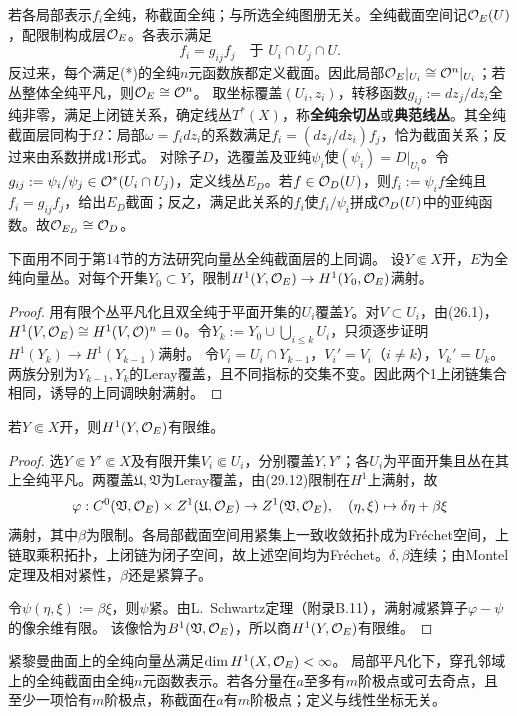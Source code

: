 若各局部表示$f_i$全纯，称截面全纯；与所选全纯图册无关。全纯截面空间记$\mathcal O_E(U)$，配限制构成层$\mathcal O_E$。各表示满足
\begin{equation}f_i=g_{ij}f_j\quad\text{于 }U_i\cap U_j\cap U.\tag{*}\end{equation}
反过来，每个满足(*)的全纯$n$元函数族都定义截面。因此局部$\mathcal O_E|_{U_i}\cong\mathcal O^n|_{U_i}$；若丛整体全纯平凡，则$\mathcal O_E\cong\mathcal O^n$。
取坐标覆盖$(U_i,z_i)$，转移函数$g_{ij}:=dz_j/dz_i$全纯非零，满足上闭链关系，确定线丛$T^*(X)$，称\textbf{全纯余切丛}或\textbf{典范线丛}。其全纯截面层同构于$\Omega$：局部$\omega=f_i dz_i$的系数满足$f_i=(dz_j/dz_i)f_j$，恰为截面关系；反过来由系数拼成1形式。
对除子$D$，选覆盖及亚纯$\psi_i$使$(\psi_i)=D|_{U_i}$。令$g_{ij}:=\psi_i/\psi_j\in\mathcal O^*(U_i\cap U_j)$，定义线丛$E_D$。若$f\in\mathcal O_D(U)$，则$f_i:=\psi_if$全纯且$f_i=g_{ij}f_j$，给出$E_D$截面；反之，满足此关系的$f_i$使$f_i/\psi_i$拼成$\mathcal O_D(U)$中的亚纯函数。故$\mathcal O_{E_D}\cong\mathcal O_D$。

下面用不同于第14节的方法研究向量丛全纯截面层的上同调。
设$Y\Subset X$开，$E$为全纯向量丛。对每个开集$Y_0\subset Y$，限制$H^1(Y,\mathcal O_E)\to H^1(Y_0,\mathcal O_E)$满射。
\begin{proof}
用有限个丛平凡化且双全纯于平面开集的$U_i$覆盖$Y$。对$V\subset U_i$，由(26.1)，$H^1(V,\mathcal O_E)\cong H^1(V,\mathcal O)^n=0$。令$Y_k:=Y_0\cup\bigcup_{i\le k}U_i$，只须逐步证明$H^1(Y_k)\to H^1(Y_{k-1})$满射。
令$V_i=U_i\cap Y_{k-1}$，$V_i'=V_i$（$i\ne k$），$V_k'=U_k$。两族分别为$Y_{k-1},Y_k$的Leray覆盖，且不同指标的交集不变。因此两个1上闭链集合相同，诱导的上同调映射满射。
\end{proof}
若$Y\Subset X$开，则$H^1(Y,\mathcal O_E)$有限维。
\begin{proof}
选$Y\Subset Y'\Subset X$及有限开集$V_i\Subset U_i$，分别覆盖$Y,Y'$；各$U_i$为平面开集且丛在其上全纯平凡。两覆盖$\mathfrak U,\mathfrak V$为Leray覆盖，由(29.12)限制在$H^1$上满射，故
\[
\varphi:C^0(\mathfrak V,\mathcal O_E)\times Z^1(\mathfrak U,\mathcal O_E)\to Z^1(\mathfrak V,\mathcal O_E),\quad
(\eta,\xi)\mapsto\delta\eta+\beta\xi
\]
满射，其中$\beta$为限制。各局部截面空间用紧集上一致收敛拓扑成为Fréchet空间，上链取乘积拓扑，上闭链为闭子空间，故上述空间均为Fréchet。$\delta,\beta$连续；由Montel定理及相对紧性，$\beta$还是紧算子。

令$\psi(\eta,\xi):=\beta\xi$，则$\psi$紧。由L.~Schwartz定理（附录B.11），满射减紧算子$\varphi-\psi$的像余维有限。
该像恰为$B^1(\mathfrak V,\mathcal O_E)$，所以商$H^1(Y,\mathcal O_E)$有限维。
\end{proof}
紧黎曼曲面上的全纯向量丛满足$\dim H^1(X,\mathcal O_E)<\infty$。
局部平凡化下，穿孔邻域上的全纯截面由全纯$n$元函数表示。若各分量在$a$至多有$m$阶极点或可去奇点，且至少一项恰有$m$阶极点，称截面在$a$有$m$阶极点；定义与线性坐标无关。

